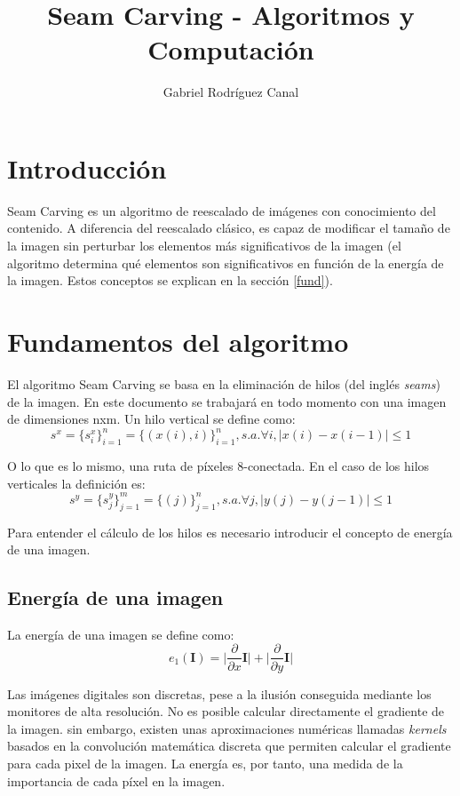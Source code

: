 \documentclass[12pt,a4paper,oneside]{article}
\date{}
\author{Gabriel Rodríguez Canal}
\title{Seam Carving - Algoritmos y Computación}
\providecommand{\abs}[1]{\lvert#1\rvert}
\begin{document}
\maketitle

\section{Introducción}

Seam Carving es un algoritmo de reescalado de imágenes con conocimiento del contenido.
A diferencia del reescalado clásico, es capaz de modificar el tamaño de la imagen sin
perturbar los elementos más significativos de la imagen (el algoritmo determina qué
elementos son significativos en función de la energía de la imagen. Estos conceptos se
explican en la sección \ref{fund}).

\section{Fundamentos del algoritmo\label{fund}}
El algoritmo Seam Carving se basa en la eliminación de hilos (del inglés
\textit{seams}) de la imagen. En este documento se trabajará en todo momento con una
imagen de dimensiones nxm. Un hilo vertical se define como:
\begin{equation}
    s^x = \{s_i^x\}_{i=1}^n = \{(x(i),i)\}_{i=1}^n, s.a.  \forall i, \abs{x(i)-x(i-1)} \leq 1
    \label{hseam}
\end{equation}

O lo que es lo mismo, una ruta de píxeles 8-conectada. En el caso de los hilos verticales
la definición es:
\begin{equation}
    s^y = \{s_j^y\}_{j=1}^m = \{(j)\}_{j=1}^n, s.a.  \forall j, \abs{y(j)-y(j-1)} \leq 1
    \label{vseam}
\end{equation}

Para entender el cálculo de los hilos es necesario introducir el concepto de energía de
una imagen.

\subsection{Energía de una imagen}
La energía de una imagen se define como:
\begin{equation}
    e_1(\textbf{I}) = \abs{\frac{\partial}{\partial x} \textbf{I}} + \abs{\frac{\partial}{\partial y} \textbf{I}}
\end{equation}

Las imágenes digitales son discretas, pese a la ilusión conseguida mediante los monitores
de alta resolución. No es posible calcular directamente el gradiente de la imagen. sin
embargo, existen unas aproximaciones numéricas llamadas \textit{kernels} basados en la
convolución matemática discreta que permiten calcular el gradiente para cada pixel de la
imagen. La energía es, por tanto, una medida de la importancia de cada píxel en la imagen.
\end{document}
